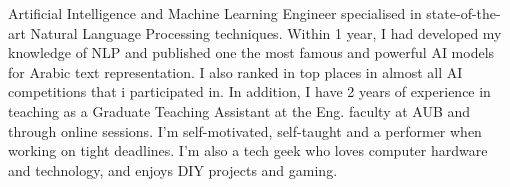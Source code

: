 

\begin{cvparagraph}

Artificial Intelligence and Machine Learning Engineer specialised in state-of-the-art Natural Language Processing techniques. Within 1 year, I had developed my knowledge of NLP and published one the most famous and powerful AI models for Arabic text representation. I also ranked in top places in almost all AI competitions that i participated in. In addition, I have 2 years of experience in teaching as a Graduate Teaching Assistant at the Eng. faculty at AUB and through online sessions. I'm self-motivated, self-taught and a performer when working on tight deadlines.
I'm also a tech geek who loves computer hardware and technology, and enjoys DIY projects and gaming.
\end{cvparagraph}
